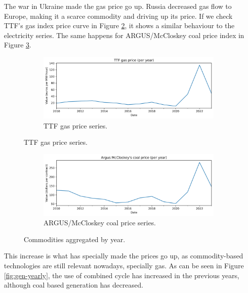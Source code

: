 The war in Ukraine made the gas price go up. Russia decreased gas flow to Europe, making it a scarce commodity and driving up its price. If we check TTF's gas index price curve in Figure \ref{fig:ttf-yearly}, it shows a similar behaviour to the electricity series. The same happens for ARGUS/McCloskey coal price index in Figure \ref{fig:coal-yearly}.

\begin{figure}[H]
\centering
    \begin{subfigure}{0.7\textwidth}
        \centering
        \includegraphics[width=1\linewidth]{images/analysis/ttf-yearly}
        \caption{TTF gas price series.}
        \label{fig:ttf-yearly}
    \end{subfigure}
\end{figure}

\begin{figure}[H]\ContinuedFloat
    \begin{subfigure}{0.7\textwidth}
        \centering
        \includegraphics[width=1\linewidth]{images/analysis/coal-yearly}
        \caption{ARGUS/McCloskey coal price series.}
        \label{fig:coal-yearly}
    \end{subfigure}

    \caption{Commodities aggregated by year.}
    \label{fig:ttf-coal-yearly}
\end{figure}

This increase is what has specially made the prices go up, as commodity-based technologies are still relevant nowadays, specially gas. As can be seen in Figure \ref{fig:gen-yearly}, the use of combined cycle has increased in the previous years, although coal based generation has decreased.

